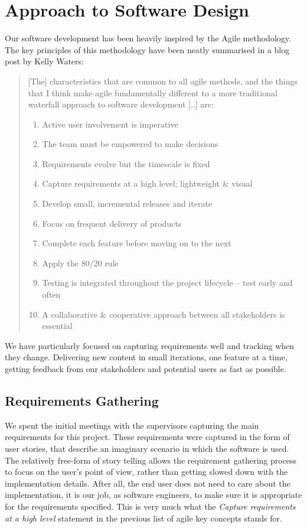 \section{Approach to Software Design}
\label{sec:design_considerations}

Our software development has been heavily inspired by the Agile methodology\cite{_manifesto_????}. 
The key principles of this methodology have been neatly summarised in a blog post by Kelly Waters\cite{_what_????}:

\blockquote{
    [The] characteristics that are common to all agile methods, and the things that I think make agile fundamentally different to a more traditional waterfall approach to software development [..] are:
    
    \begin{enumerate}
        \item Active user involvement is imperative 
        \item The team must be empowered to make decisions 
        \item Requirements evolve but the timescale is fixed 
        \item Capture requirements at a high level; lightweight \& visual 
        \item Develop small, incremental releases and iterate 
        \item Focus on frequent delivery of products 
        \item Complete each feature before moving on to the next 
        \item Apply the 80/20 rule 
        \item Testing is integrated throughout the project lifecycle – test early and often 
        \item A collaborative \& cooperative approach between all stakeholders is essential 
    \end{enumerate}
}

We have particularly focused on capturing requirements well and tracking when they change. 
Delivering new content in small iterations, one feature at a time, getting feedback from our stakeholders and potential users as fast as possible.

\subsection{Requirements Gathering}

We spent the initial meetings with the supervisors capturing the main requirements for this project. These requirements were captured in the form of user stories, that describe an imaginary scenario in which the software is used. 
The relatively free-form of story telling allows the requirement gathering process to focus on the user's point of view, rather than getting slowed down with the implementation details. 
After all, the end user does not need to care about the implementation, it is our job, as software engineers, to make sure it is appropriate for the requirements specified.
This is very much what the \emph{Capture requirements at a high level} statement in the previous list of agile key concepts stands for.

